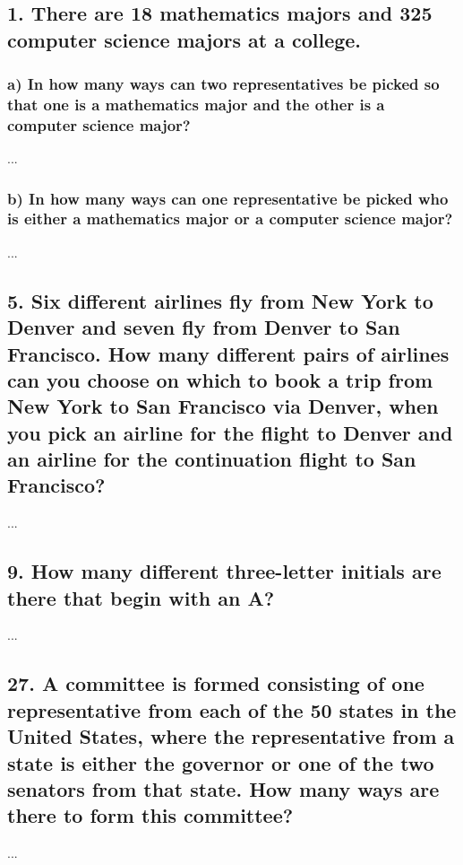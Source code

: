 \documentclass[11pt, oneside]{article} %
\numberwithin{equation}{section} %
\numberwithin{figure}{section} %
\numberwithin{table}{section} %
\begin{document}

\section{}
\subsection{1. There are 18 mathematics majors and 325 computer science majors at a college.}
\subsubsection{a) In how many ways can two representatives be picked so that one is a mathematics major and the other is a computer science major?}
...

\subsubsection{b) In how many ways can one representative be picked who is either a mathematics major or a computer science major?}
...


\subsection{5. Six different airlines fly from New York to Denver and seven fly from Denver to San Francisco. How many different pairs of airlines can you choose on which to book a trip from New York to San Francisco via Denver, when you pick an airline for the flight to Denver and an airline for the continuation flight to San Francisco?}
...

\subsection{9. How many different three-letter initials are there that begin with an A?}
...


\subsection{27. A committee is formed consisting of one representative from each of the 50 states in the United States, where the representative from a state is either the governor or one of the two senators from that state. How many ways are there to form this committee?}
...
 
\end{document}

